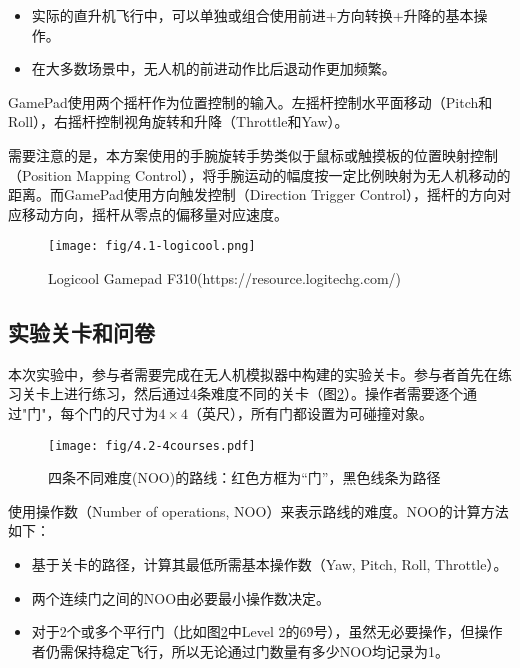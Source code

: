 \begin{itemize}
    \item 实际的直升机飞行中，可以单独或组合使用前进+方向转换+升降的基本操作。
    \item 在大多数场景中，无人机的前进动作比后退动作更加频繁。
\end{itemize}

GamePad使用两个摇杆作为位置控制的输入。左摇杆控制水平面移动（Pitch和Roll），右摇杆控制视角旋转和升降（Throttle和Yaw）。

需要注意的是，本方案使用的手腕旋转手势类似于鼠标或触摸板的位置映射控制（Position Mapping Control），将手腕运动的幅度按一定比例映射为无人机移动的距离。而GamePad使用方向触发控制（Direction Trigger Control），摇杆的方向对应移动方向，摇杆从零点的偏移量对应速度。

\begin{figure}[htbp]
    \centering
    \texttt{[image: fig/4.1-logicool.png]}
    \caption{\label{5.1-1-logicool}Logicool Gamepad F310(https://resource.logitechg.com/)}
\end{figure}

\subsection{实验关卡和问卷}\label{ssec:coures_and_qustionnaire}

本次实验中，参与者需要完成在无人机模拟器中构建的实验关卡。参与者首先在练习关卡上进行练习，然后通过4条难度不同的关卡（图\ref{fig:5.2-1-4courses}）。操作者需要逐个通过"门"，每个门的尺寸为$4 \times 4$（英尺），所有门都设置为可碰撞对象。

\begin{figure}[htbp]
    \centering
    \texttt{[image: fig/4.2-4courses.pdf]}
    \caption{\label{fig:5.2-1-4courses}四条不同难度(NOO)的路线：红色方框为“门”，黑色线条为路径}
\end{figure}

使用操作数（Number of operations, NOO）来表示路线的难度。NOO的计算方法如下：

\begin{itemize}
    \item 基于关卡的路径，计算其最低所需基本操作数（Yaw, Pitch, Roll, Throttle）。
    \item 两个连续门之间的NOO由必要最小操作数决定。
    \item 对于2个或多个平行门（比如图\ref{fig:5.2-1-4courses}中Level 2的6\~9号），虽然无必要操作，但操作者仍需保持稳定飞行，所以无论通过门数量有多少NOO均记录为1。
\end{itemize}


